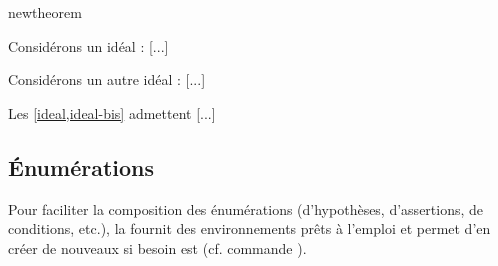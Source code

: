 \documentclass[english,nolocaltoc]{nwejmart}
\newtheorem[style=definition]{fait}
\newtheorem[title=expérience]{experience}
\newtheorem[title-plural=anneaux]{anneau}
\newtheorem[title=idéal,title-plural=idéaux]{ideal}
\begin{document}
\begin{docCommand}{newtheorem}{}
\begin{bodycode}[listing and text,listing options={deletekeywords={[2]label}}]
\begin{ideal}\label{ideal}
Considérons un idéal : [...]
\end{ideal}
\begin{ideal}\label{ideal-bis}
Considérons un autre idéal : [...]
\end{ideal}
Les \vref{ideal,ideal-bis} admettent [...]
\end{bodycode}

\end{docCommand}

\subsection{Énumérations}
\label{sec:list-dhyp-ou}

Pour faciliter la composition des énumérations (d'hypothèses, d'assertions, de
conditions, etc.), la \nwejmauthorcl{} fournit des environnements prêts
à l'emploi et permet d'en créer de nouveaux si besoin est (cf. commande
).
\end{document}
